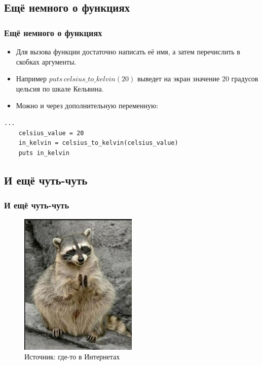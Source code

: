 \documentclass[compress,red]{beamer}
\begin{document}
\subsection{Ещё немного о функциях}
\begin{frame}[fragile]
\frametitle{Ещё немного о функциях}
  \begin{itemize}
    \item Для вызова функции достаточно написать её имя, а затем перечислить в скобках аргументы.
    \item Например $puts\,celsius\_to\_kelvin(20)$ выведет на экран значение 20 градусов цельсия по шкале Кельвина.
    \item Можно и через дополнительную переменную:
  \end{itemize}
  \scriptsize{
  \begin{lstlisting}[label=ruby4,caption=Функции]
    ...
    celsius_value = 20
    in_kelvin = celsius_to_kelvin(celsius_value)
    puts in_kelvin
  \end{lstlisting}}
\end{frame}

\subsection{И ещё чуть-чуть}
\begin{frame}[fragile]
  \frametitle{И ещё чуть-чуть}
  \begin{figure}
    \includegraphics[width=0.5\textwidth]{images/acouple.jpg}
    \caption{\scriptsize{Источник: где-то в Интернетах}}
  \end{figure}
\end{frame}
\end{document}

